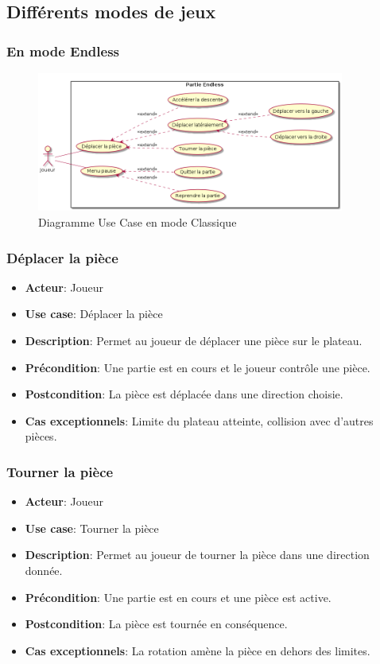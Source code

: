\documentclass{article}
\begin{document}
\subsection{Différents modes de jeux}

\subsubsection{En mode Endless}

\begin{figure}[!h]
    \centering
    \includegraphics[width=0.9\textwidth]{./uml/usescase/en-jeu/endless.png}
    \caption{Diagramme Use Case en mode Classique}
    \label{fig:Classique}
\end{figure}

\subsubsection*{Déplacer la pièce}
\begin{itemize}
    \item \textbf{Acteur}: Joueur
    \item \textbf{Use case}: Déplacer la pièce
    \item \textbf{Description}: Permet au joueur de déplacer une pièce sur le plateau.
    \item \textbf{Précondition}: Une partie est en cours et le joueur contrôle une pièce.
    \item \textbf{Postcondition}: La pièce est déplacée dans une direction choisie.
    \item \textbf{Cas exceptionnels}: Limite du plateau atteinte, collision avec d'autres pièces.
\end{itemize}

\subsubsection*{Tourner la pièce}
\begin{itemize}
    \item \textbf{Acteur}: Joueur
    \item \textbf{Use case}: Tourner la pièce
    \item \textbf{Description}: Permet au joueur de tourner la pièce dans une direction donnée.
    \item \textbf{Précondition}: Une partie est en cours et une pièce est active.
    \item \textbf{Postcondition}: La pièce est tournée en conséquence.
    \item \textbf{Cas exceptionnels}: La rotation amène la pièce en dehors des limites.
\end{itemize}
\end{document}
